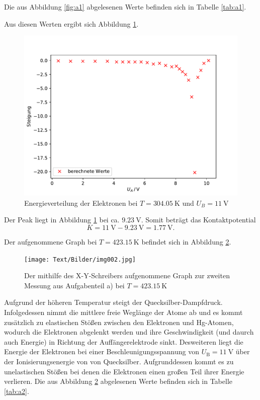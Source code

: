 Die aus Abbildung \ref{fig:a1} abgelesenen Werte befinden sich in Tabelle \ref{tab:a1}.


Aus diesen Werten ergibt sich Abbildung \ref{fig:a12}.
\begin{figure}[H]
  \centering
  \includegraphics[width=.9\textwidth]{Plots/a1.pdf}
  \caption{Energieverteilung der Elektronen bei $T = \SI{304,05}{\K}$ und $U_B = \SI{11}{\V}$}
  \label{fig:a12}
\end{figure}

Der Peak liegt in Abbildung \ref{fig:a12} bei ca. $\SI{9,23}{\V}$. Somit beträgt das Kontaktpotential
\begin{equation*}
  K = \SI{11}{\V} - \SI{9,23}{\V} = \SI{1,77}{\V}.
\end{equation*}

Der aufgenommene Graph bei $T = \SI{423,15}{\K}$ befindet sich in Abbildung \ref{fig:a2}.
\begin{figure}[H]
  \centering
  \texttt{[image: Text/Bilder/img002.jpg]}
  \caption{Der mithilfe des X-Y-Schreibers aufgenommene Graph zur zweiten Messung aus Aufgabenteil a) bei $T = \SI{423,15}{\K}$}
  \label{fig:a2}
\end{figure}

Aufgrund der höheren Temperatur steigt der Quecksilber-Dampfdruck. Infolgedessen nimmt die mittlere freie Weglänge der Atome ab und es
kommt zusätzlich zu elastischen Stößen zwischen den Elektronen und Hg-Atomen, wodurch die Elektronen abgelenkt werden und ihre Geschwindigkeit
(und daurch auch Energie) in Richtung der Auffängerelektrode sinkt. Desweiteren liegt die Energie der Elektronen bei einer
Beschleunigungsspannung von $U_\text{B} = \SI{11}{\V}$ über der Ionisierungsenergie von von Quecksilber. Aufgrunddessen kommt es zu unelastischen
Stößen bei denen die Elektronen einen großen Teil ihrer Energie verlieren.
\newpage
Die aus Abbildung \ref{fig:a2} abgelesenen Werte befinden sich in Tabelle \ref{tab:a2}.


